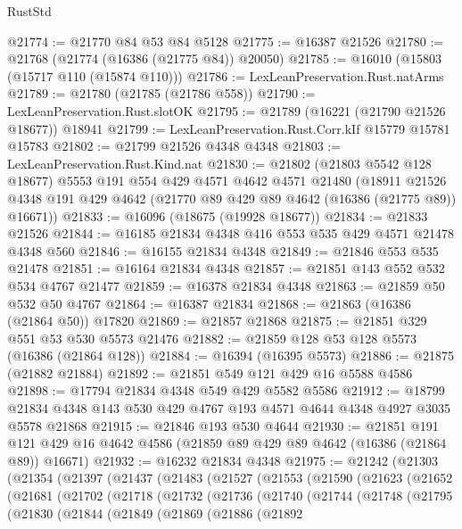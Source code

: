 \begin{lexlean}{RustStd}
\begin{coremodule}
@21774 := @21770 @84 @53 @84 @5128
@21775 := @16387 @21526
@21780 := @21768 (@21774 (@16386 (@21775 @84)) @20050)
@21785 := @16010 (@15803 (@15717 @110 (@15874 @110)))
@21786 := LexLeanPreservation.Rust.natArms
@21789 := @21780 (@21785 (@21786 @558))
@21790 := LexLeanPreservation.Rust.slotOK
@21795 := @21789 (@16221 (@21790 @21526 @18677)) @18941
@21799 := LexLeanPreservation.Rust.Corr.kIf @15779 @15781 @15783
@21802 := @21799 @21526 @4348 @4348
@21803 := LexLeanPreservation.Rust.Kind.nat
@21830 := @21802
    (@21803 @5542 @128 @18677)
    @5553
    @191
    @554
    @429
    @4571
    @4642
    @4571
    @21480
    (@18911 @21526 @4348 @191 @429 @4642 (@21770 @89 @429 @89 @4642 (@16386 (@21775 @89)) @16671))
@21833 := @16096 (@18675 (@19928 @18677))
@21834 := @21833 @21526
@21844 := @16185 @21834 @4348 @416 @553 @535 @429 @4571 @21478 @4348 @560
@21846 := @16155 @21834 @4348
@21849 := @21846 @553 @535 @21478
@21851 := @16164 @21834 @4348
@21857 := @21851 @143 @552 @532 @534 @4767 @21477
@21859 := @16378 @21834 @4348
@21863 := @21859 @50 @532 @50 @4767
@21864 := @16387 @21834
@21868 := @21863 (@16386 (@21864 @50)) @17820
@21869 := @21857 @21868
@21875 := @21851 @329 @551 @53 @530 @5573 @21476
@21882 := @21859 @128 @53 @128 @5573 (@16386 (@21864 @128))
@21884 := @16394 (@16395 @5573)
@21886 := @21875 (@21882 @21884)
@21892 := @21851 @549 @121 @429 @16 @5588 @4586
@21898 := @17794 @21834 @4348 @549 @429 @5582 @5586
@21912 := @18799 @21834 @4348 @143 @530 @429 @4767 @193 @4571 @4644 @4348 @4927 @3035 @5578 @21868
@21915 := @21846 @193 @530 @4644
@21930 := @21851
    @191
    @121
    @429
    @16
    @4642
    @4586
    (@21859 @89 @429 @89 @4642 (@16386 (@21864 @89)) @16671)
@21932 := @16232 @21834 @4348
@21975 := @21242
    (@21303
      (@21354
        (@21397
          (@21437
            (@21483
              (@21527
                (@21553
                  (@21590
                    (@21623
                      (@21652
                        (@21681
                          (@21702
                            (@21718
                              (@21732
                                (@21736
                                  (@21740
                                    (@21744
                                      (@21748
                                        (@21795
                                          (@21830
                                            (@21844
                                              (@21849
                                                (@21869
                                                  (@21886
                                                    (@21892

\end{coremodule}
\end{lexlean}
